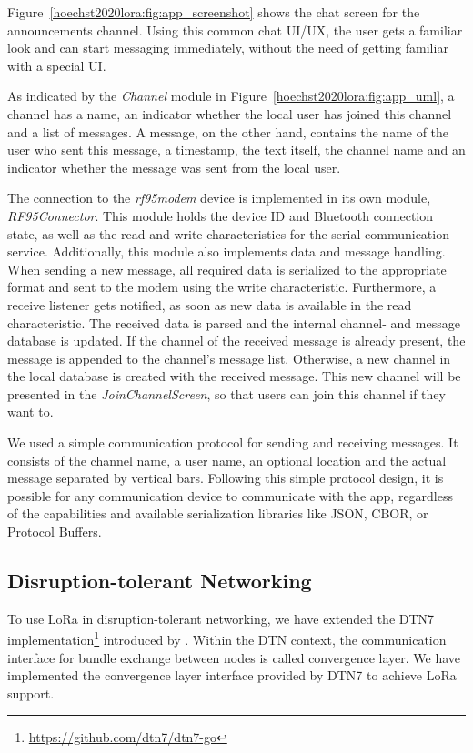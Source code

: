Figure~\ref{hoechst2020lora:fig:app_screenshot} shows the chat screen for the announcements channel.
Using this common chat UI/UX, the user gets a familiar look and can start messaging immediately, without the need of getting familiar with a special UI.

As indicated by the \emph{Channel} module in Figure~\ref{hoechst2020lora:fig:app_uml}, a channel has a name, an indicator whether the local user has joined this channel and a list of messages.
A message, on the other hand, contains the name of the user who sent this message, a timestamp, the text itself, the channel name and an indicator whether the message was sent from the local user.

The connection to the \textit{rf95modem} device is implemented in its own module, \emph{RF95Connector}.
This module holds the device ID and Bluetooth connection state, as well as the read and write characteristics for the serial communication service.
Additionally, this module also implements data and message handling.
When sending a new message, all required data is serialized to the appropriate format and sent to the modem using the write characteristic.
Furthermore, a receive listener gets notified, as soon as new data is available in the read characteristic.
The received data is parsed and the internal channel- and message database is updated.
If the channel of the received message is already present, the message is appended to the channel's message list.
Otherwise, a new channel in the local database is created with the received message.
This new channel will be presented in the \emph{JoinChannelScreen}, so that users can join this channel if they want to.

We used a simple communication protocol for sending and receiving messages.
It consists of the channel name, a user name, an optional location and the actual message separated by vertical bars.
Following this simple protocol design, it is possible for any communication device to communicate with the app, regardless of the capabilities and available serialization libraries like JSON, CBOR, or Protocol Buffers.


\subsection{Disruption-tolerant Networking}
To use LoRa in disruption-tolerant networking, we have extended the DTN7 implementation\footnote{\url{https://github.com/dtn7/dtn7-go}} introduced by \cite{penning2019dtn7}.
Within the DTN context, the communication interface for bundle exchange between nodes is called convergence layer.
We have implemented the convergence layer interface provided by DTN7 to achieve LoRa support.

